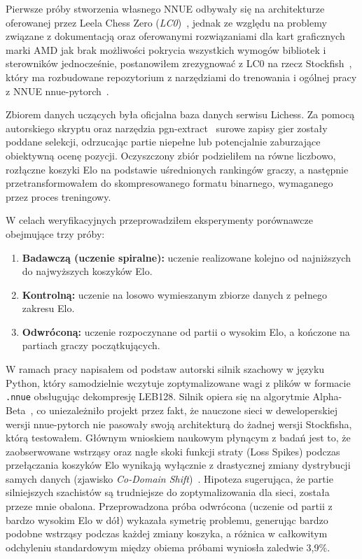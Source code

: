 \documentclass[12pt,a4paper]{report}
\begin{document}
Pierwsze próby stworzenia własnego NNUE odbywały się na architekturze oferowanej przez Leela Chess Zero (\textit{LC0})~\cite{lc0}, jednak ze względu na problemy związane z dokumentacją oraz oferowanymi rozwiązaniami dla kart graficznych marki AMD jak brak możliwości pokrycia wszystkich wymogów bibliotek i sterowników jednocześnie, postanowiłem zrezygnować z LC0 na rzecz Stockfish~\cite{stockfish}, który ma rozbudowane repozytorium z narzędziami do trenowania i ogólnej pracy z NNUE nnue-pytorch~\cite{nnuepytorch}.

Zbiorem danych uczących była oficjalna baza danych serwisu Lichess. Za pomocą autorskiego skryptu oraz narzędzia pgn-extract~\cite{pgnextract} surowe zapisy gier zostały poddane selekcji, odrzucając partie niepełne lub potencjalnie zaburzające obiektywną ocenę pozycji. Oczyszczony zbiór podzieliłem na równe liczbowo, rozłączne koszyki Elo na podstawie uśrednionych rankingów graczy, a następnie przetransformowałem do skompresowanego formatu binarnego, wymaganego przez proces treningowy.

W celach weryfikacyjnych przeprowadziłem eksperymenty porównawcze obejmujące trzy próby:
\begin{enumerate}
    \item \textbf{Badawczą (uczenie spiralne):} uczenie realizowane kolejno od najniższych do najwyższych koszyków Elo.
    \item \textbf{Kontrolną:} uczenie na losowo wymieszanym zbiorze danych z pełnego zakresu Elo.
    \item \textbf{Odwróconą:} uczenie rozpoczynane od partii o wysokim Elo, a kończone na partiach graczy początkujących.
\end{enumerate}

W ramach pracy napisałem od podstaw autorski silnik szachowy w języku Python, który samodzielnie wczytuje zoptymalizowane wagi z plików w formacie \texttt{.nnue} obsługując dekompresję LEB128. Silnik opiera się na algorytmie Alpha-Beta~\cite{knuth1975analysis}, co uniezależniło projekt przez fakt, że nauczone sieci w deweloperskiej wersji nnue-pytorch nie pasowały swoją architekturą do żadnej wersji Stockfisha, którą testowałem. Głównym wnioskiem naukowym płynącym z badań jest to, że zaobserwowane wstrząsy oraz nagłe skoki funkcji straty (Loss Spikes) podczas przełączania koszyków Elo wynikają wyłącznie z drastycznej zmiany dystrybucji samych danych (zjawisko \textit{Co-Domain Shift})~\cite{learning2009dataset}. Hipoteza sugerująca, że partie silniejszych szachistów są trudniejsze do zoptymalizowania dla sieci, została przeze mnie obalona. Przeprowadzona próba odwrócona (uczenie od partii z bardzo wysokim Elo w dół) wykazała symetrię problemu, generując bardzo podobne wstrząsy podczas każdej zmiany koszyka, a różnica w całkowitym odchyleniu standardowym między obiema próbami wyniosła zaledwie 3,9\%.
\end{document}
